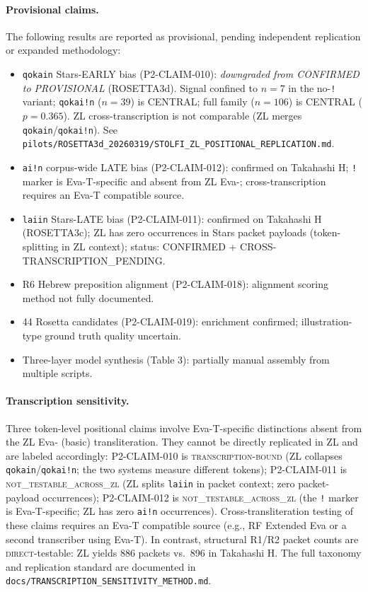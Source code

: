 \documentclass[11pt,a4paper,twocolumn]{article}
\begin{document}
\paragraph{Provisional claims.}
The following results are reported as provisional, pending independent replication or expanded methodology:
\begin{itemize}[noitemsep]
  \item \texttt{qokain} Stars-EARLY bias (P2-CLAIM-010): \textit{downgraded from CONFIRMED to PROVISIONAL} (ROSETTA3d). Signal confined to $n=7$ in the no-\texttt{!} variant; \texttt{qokai!n} ($n=39$) is CENTRAL; full family ($n=106$) is CENTRAL ($p=0.365$). ZL cross-transcription is not comparable (ZL merges \texttt{qokain}/\texttt{qokai!n}). See \texttt{pilots/ROSETTA3d\_20260319/STOLFI\_ZL\_POSITIONAL\_REPLICATION.md}.
  \item \texttt{ai!n} corpus-wide LATE bias (P2-CLAIM-012): confirmed on Takahashi H; \texttt{!} marker is Eva-T-specific and absent from ZL Eva-; cross-transcription requires an Eva-T compatible source.
  \item \texttt{laiin} Stars-LATE bias (P2-CLAIM-011): confirmed on Takahashi H (ROSETTA3c); ZL has zero occurrences in Stars packet payloads (token-splitting in ZL context); status: CONFIRMED + CROSS-TRANSCRIPTION\_PENDING.
  \item R6 Hebrew preposition alignment (P2-CLAIM-018): alignment scoring method not fully documented.
  \item 44 Rosetta candidates (P2-CLAIM-019): enrichment confirmed; illustration-type ground truth quality uncertain.
  \item Three-layer model synthesis (Table 3): partially manual assembly from multiple scripts.
\end{itemize}

\paragraph{Transcription sensitivity.}
Three token-level positional claims involve Eva-T-specific distinctions absent from the ZL Eva- (basic) transliteration. They cannot be directly replicated in ZL and are labeled accordingly: P2-CLAIM-010 is \textsc{transcription-bound} (ZL collapses \texttt{qokain}/\texttt{qokai!n}; the two systems measure different tokens); P2-CLAIM-011 is \textsc{not\_testable\_across\_zl} (ZL splits \texttt{laiin} in packet context; zero packet-payload occurrences); P2-CLAIM-012 is \textsc{not\_testable\_across\_zl} (the \texttt{!} marker is Eva-T-specific; ZL has zero \texttt{ai!n} occurrences). Cross-transliteration testing of these claims requires an Eva-T compatible source (e.g., RF Extended Eva or a second transcriber using Eva-T). In contrast, structural R1/R2 packet counts are \textsc{direct}-testable: ZL yields 886 packets vs.\ 896 in Takahashi H. The full taxonomy and replication standard are documented in \texttt{docs/TRANSCRIPTION\_SENSITIVITY\_METHOD.md}.
\end{document}
